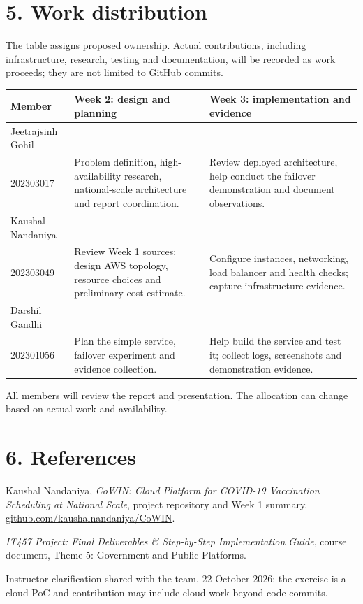 \documentclass[11pt,a4paper]{article}
\newcommand{\sectionline}[1]{\section*{\color{navy}#1}}
\begin{document}
\sectionline{5. Work distribution}
The table assigns proposed ownership. Actual contributions, including infrastructure, research, testing and documentation, will be recorded as work proceeds; they are not limited to GitHub commits.

\small
\begin{tabularx}{\textwidth}{@{}p{31mm}YY@{}}\toprule
\textbf{Member} & \textbf{Week 2: design and planning} & \textbf{Week 3: implementation and evidence}\\\midrule
Jeetrajsinh Gohil\\202303017 & Problem definition, high-availability research, national-scale architecture and report coordination. & Review deployed architecture, help conduct the failover demonstration and document observations.\\\addlinespace
Kaushal Nandaniya\\202303049 & Review Week 1 sources; design AWS topology, resource choices and preliminary cost estimate. & Configure instances, networking, load balancer and health checks; capture infrastructure evidence.\\\addlinespace
Darshil Gandhi\\202301056 & Plan the simple service, failover experiment and evidence collection. & Help build the service and test it; collect logs, screenshots and demonstration evidence.\\\bottomrule
\end{tabularx}
\normalsize
All members will review the report and presentation. The allocation can change based on actual work and availability.
\sectionline{6. References}
\begin{enumerate}[label={[\arabic*]}]
\item Kaushal Nandaniya, \textit{CoWIN: Cloud Platform for COVID-19 Vaccination Scheduling at National Scale}, project repository and Week 1 summary. \href{https://github.com/kaushalnandaniya/CoWIN}{github.com/kaushalnandaniya/CoWIN}.
\item \textit{IT457 Project: Final Deliverables \& Step-by-Step Implementation Guide}, course document, Theme 5: Government and Public Platforms.
\item Instructor clarification shared with the team, 22 October 2026: the exercise is a cloud PoC and contribution may include cloud work beyond code commits.
\end{enumerate}
\end{document}

